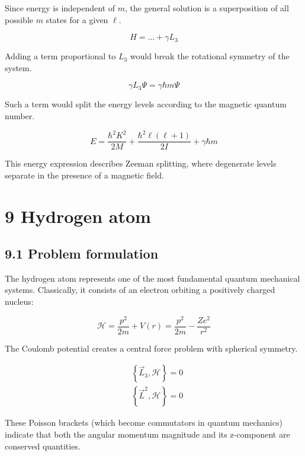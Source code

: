 \documentclass[italian]{HKNdocument}
\begin{document}
Since energy is independent of $m$, the general solution is a superposition of all possible $m$ states for a given $\ell$.

\begin{equation*}
H=\ldots+\gamma L_{3} \tag{8.80}
\end{equation*}

Adding a term proportional to $L_3$ would break the rotational symmetry of the system.

\begin{equation*}
\gamma L_{3} \Psi=\gamma \hbar m \Psi \tag{8.81}
\end{equation*}

Such a term would split the energy levels according to the magnetic quantum number.

\begin{equation*}
E=\frac{\hbar^{2} K^{2}}{2 M}+\frac{\hbar^{2} \ell(\ell+1)}{2 I}+\gamma \hbar m \tag{8.82}
\end{equation*}

This energy expression describes Zeeman splitting, where degenerate levels separate in the presence of a magnetic field.

\section*{9 Hydrogen atom}
\subsection*{9.1 Problem formulation}
The hydrogen atom represents one of the most fundamental quantum mechanical systems. Classically, it consists of an electron orbiting a positively charged nucleus:

\begin{equation*}
\mathcal{H}=\frac{p^{2}}{2 m}+V(r)=\frac{p^{2}}{2 m}-\frac{Z e^{2}}{r^{2}} \tag{9.1}
\end{equation*}

The Coulomb potential creates a central force problem with spherical symmetry.

\begin{align*}
& \left\{\vec{L}_{3}, \mathcal{H}\right\}=0 \\
& \left\{\vec{L}^{2}, \mathcal{H}\right\}=0 \tag{9.2}
\end{align*}

These Poisson brackets (which become commutators in quantum mechanics) indicate that both the angular momentum magnitude and its z-component are conserved quantities.
\end{document}
